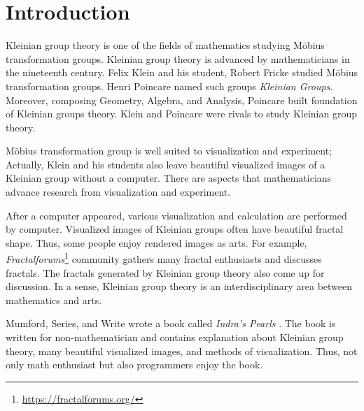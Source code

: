 
\section{Introduction}

Kleinian group theory is one of the fields of mathematics studying 
M\"obius transformation groups.
Kleinian group theory is advanced by mathematicians in the nineteenth
century.
Felix Klein and his student, Robert Fricke studied M\"obius
transformation groups.
Henri Poincare named such groups \textit{Kleinian Groups}.
Moreover, composing Geometry, Algebra, and Analysis,
Poincare built foundation of Kleinian groups theory.
Klein and Poincare were rivals to study Kleinian group theory.


M\"obius transformation group is well suited to visualization and
experiment; Actually, Klein and his students also leave beautiful
visualized images of a Kleinian group without a computer.
There are aspects that mathematicians advance research from
visualization and experiment.

After a computer appeared, various visualization and calculation are
performed by computer.
Visualized images of Kleinian groups often have beautiful fractal shape.
Thus, some people enjoy rendered images as arts.
For example,
\textit{Fractalforums}\footnote{\url{https://fractalforums.org/}}
community gathers many fractal enthusiasts and discusses fractals.
The fractals generated by Kleinian group theory also come up for
discussion.
In a sense, Kleinian group theory is an interdisciplinary area between
mathematics and arts.

Mumford, Series, and Write wrote a book called
\textit{Indra's Pearls} \cite{MumfordSeriesWright200204}.
The book is written for non-mathematician and contains explanation
about Kleinian group theory, many beautiful visualized images, and
methods of visualization.
Thus, not only math enthusiast but also programmers enjoy the book.

